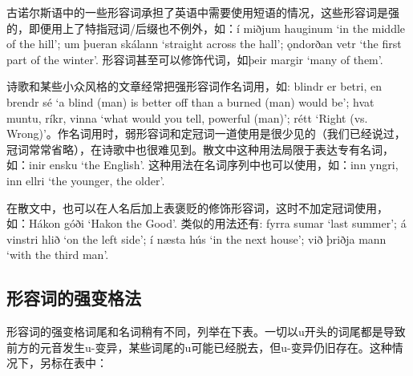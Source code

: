 古诺尔斯语中的一些形容词承担了英语中需要使用短语的情况，这些形容词是强的，即便用上了特指冠词/后缀也不例外，如：í
miðjum hauginum `in the middle of the hill‌'; um þueran skálann `straight
across the hall‌'; ǫndorðan vetr `the first part of the winter‌'.
形容词甚至可以修饰代词，如þeir margir `many of them‌'.

诗歌和某些小众风格的文章经常把强形容词作名词用，如: blindr er betri, en
brendr sé `a blind (man) is better off than a burned (man) would be‌';
hvat muntu, ríkr, vinna `what would you tell, powerful (man)‌'; rétt
`Right (vs.
Wrong)‌'。作名词用时，弱形容词和定冠词一道使用是很少见的（我们已经说过，冠词常常省略），在诗歌中也很难见到。散文中这种用法局限于表达专有名词，如：inir
ensku `the English‌'. 这种用法在名词序列中也可以使用，如：inn yngri, inn
ellri `the younger, the older‌'.

在散文中，也可以在人名后加上表褒贬的修饰形容词，这时不加定冠词使用，
如：Hákon góði `Hakon the Good‌'. 类似的用法还有: fyrra sumar `last
summer‌'; á vinstri hlið `on the left side‌'; í næsta hús `in the next
house‌'; við þriðja mann `with the third man‌'.

\subsection{形容词的强变格法}\label{形容词的强变格法}

形容词的强变格词尾和名词稍有不同，列举在下表。一切以u开头的词尾都是导致前方的元音发生u-变异，某些词尾的u可能已经脱去，但u-变异仍旧存在。这种情况下，另标在表中：

